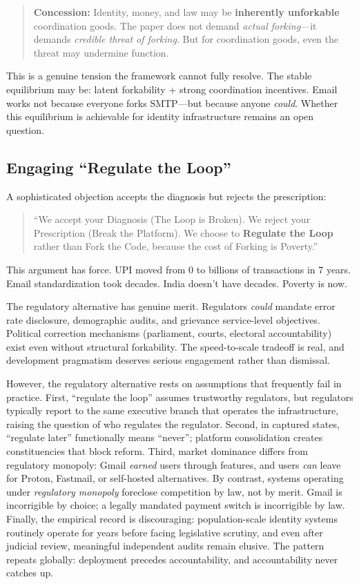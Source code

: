 \begin{quote}
\textbf{Concession:} Identity, money, and law may be \textbf{inherently unforkable} coordination goods. The paper does not demand \textit{actual forking}---it demands \textit{credible threat of forking}. But for coordination goods, even the threat may undermine function.
\end{quote}

This is a genuine tension the framework cannot fully resolve. The stable equilibrium may be: latent forkability + strong coordination incentives. Email works not because everyone forks SMTP---but because anyone \textit{could}. Whether this equilibrium is achievable for identity infrastructure remains an open question.

\subsection{Engaging ``Regulate the Loop''}
\label{subsec:regulate}

A sophisticated objection accepts the diagnosis but rejects the prescription:

\begin{quote}
``We accept your Diagnosis (The Loop is Broken). We reject your Prescription (Break the Platform). We choose to \textbf{Regulate the Loop} rather than Fork the Code, because the cost of Forking is Poverty.''
\end{quote}

This argument has force. UPI moved from 0 to billions of transactions in 7 years. Email standardization took decades. India doesn't have decades. Poverty is now.

The regulatory alternative has genuine merit. Regulators \textit{could} mandate error rate disclosure, demographic audits, and grievance service-level objectives. Political correction mechanisms (parliament, courts, electoral accountability) exist even without structural forkability. The speed-to-scale tradeoff is real, and development pragmatism deserves serious engagement rather than dismissal.

However, the regulatory alternative rests on assumptions that frequently fail in practice. First, ``regulate the loop'' assumes trustworthy regulators, but regulators typically report to the same executive branch that operates the infrastructure, raising the question of who regulates the regulator. Second, in captured states, ``regulate later'' functionally means ``never''; platform consolidation creates constituencies that block reform. Third, market dominance differs from regulatory monopoly: Gmail \textit{earned} users through features, and users \textit{can} leave for Proton, Fastmail, or self-hosted alternatives. By contrast, systems operating under \textit{regulatory monopoly} foreclose competition by law, not by merit. Gmail is incorrigible by choice; a legally mandated payment switch is incorrigible by law. Finally, the empirical record is discouraging: population-scale identity systems routinely operate for years before facing legislative scrutiny, and even after judicial review, meaningful independent audits remain elusive. The pattern repeats globally: deployment precedes accountability, and accountability never catches up.

